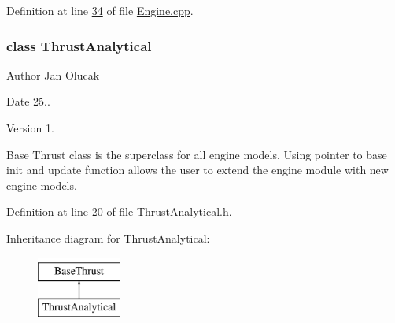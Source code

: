 Definition at line \hyperlink{_engine_8cpp_source_l00034}{34} of file \hyperlink{_engine_8cpp_source}{Engine.\+cpp}.

\label{class_thrust_analytical}
\subsubsection{class Thrust\+Analytical}
\begin{DoxyAuthor}{Author}
Jan Olucak 
\end{DoxyAuthor}
\begin{DoxyDate}{Date}
25.. 
\end{DoxyDate}
\begin{DoxyVersion}{Version}
1.
\end{DoxyVersion}
Base Thrust class is the superclass for all engine models. Using pointer to base init and update function allows the user to extend the engine module with new engine models. 

Definition at line \hyperlink{_thrust_analytical_8h_source_l00020}{20} of file \hyperlink{_thrust_analytical_8h_source}{Thrust\+Analytical.\+h}.

Inheritance diagram for Thrust\+Analytical\+:\begin{figure}[H]
\begin{center}
\leavevmode
\includegraphics[height=2.000000cm]{group___engine}
\end{center}
\end{figure}
